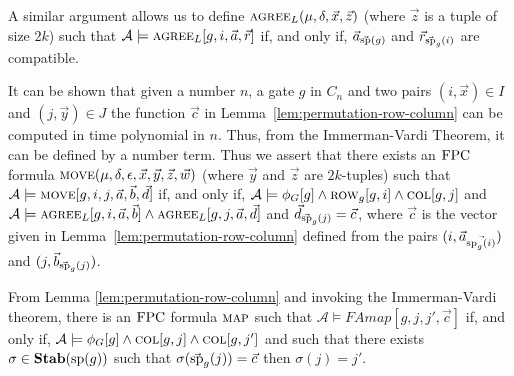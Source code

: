 \documentclass[../paper.tex]{subfiles}
\begin{document}

A similar argument allows us to define $\textsc{agree}_L (\mu, \delta , \vec{x}, \vec{z})$ (where $\vec{z}$ is a tuple of size $2k$) such that $\mathcal{A} \models \textsc{agree}_L [g, i, \vec{a}, \vec{r}]$ if, and only if, $\vec{a}_{\vec{\text{sp}}(g)}$ and $\vec{r}_{\vec{\text{sp}}_g(i)}$ are compatible.

It can be shown that given a number $n$, a gate $g$ in $C_n$ and two pairs $(i, \vec{x}) \in I$ and $(j, \vec{y}) \in J$ the function $\vec{c}$ in Lemma~\ref{lem:permutation-row-column} can be computed in time polynomial in $n$. Thus, from the Immerman-Vardi Theorem, it can be defined by a number term. Thus we assert that there exists an $\text{\upshape FPC}$ formula $\textsc{move} (\mu, \delta, \epsilon, \vec{x}, \vec{y}, \vec{z}, \vec{w})$ (where $\vec{y}$ and $\vec{z}$ are $2k$-tuples) such that $\mathcal{A} \models \textsc{move} [g, i, j, \vec{a}, \vec{b}, \vec{d}]$ if, and only if, $\mathcal{A} \models \phi_G [g] \land \textsc{row}_g[g,i] \land \textsc{col}[g, j]$ and $\mathcal{A} \models \textsc{agree}_L [g, i, \vec{a}, \vec{b}] \land \textsc{agree}_L [g, j, \vec{a}, \vec{d}]$ and $\vec{d}_{\vec{\text{sp}}_g(j)} = \vec{c}$, where $\vec{c}$ is the vector given in Lemma~\ref{lem:permutation-row-column} defined from the pairs $(i, \vec{a}_{\vec{\text{sp}_g(i)}})$ and $(j, \vec{b}_{\vec{\text{sp}}_g(j)})$.

From Lemma \ref{lem:permutation-row-column} and invoking the Immerman-Vardi theorem, there is an $\text{\upshape FPC}$ formula $\textsc{map}$ such that $\mathcal{A} \models FA{map}[g, j, j', \vec{c}]$ if, and only if, $\mathcal{A} \models \phi_G [g] \land \textsc{col}[g, j] \land \textsc{col}[g, j']$ and such that there exists $\sigma \in \text{\textbf{Stab}} (\text{sp} (g))$ such that $\sigma (\vec{\text{sp}}_g(j)) = \vec{c}$ then $\sigma (j) = j'$. 
				
				
\end{document}
